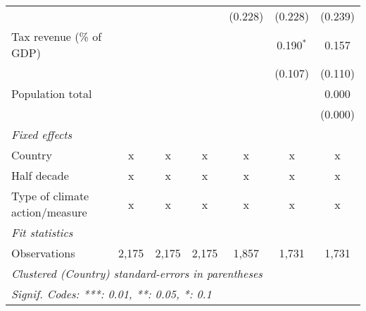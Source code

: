 \begin{tabular}{lcccccc}
                                                                 &             &         &         & (0.228)       & (0.228)      & (0.239)\\   
   Tax revenue (\% of GDP)                                       &             &         &         &               & 0.190$^{*}$  & 0.157\\   
                                                                 &             &         &         &               & (0.107)      & (0.110)\\   
   Population total                                              &             &         &         &               &              & 0.000\\   
                                                                 &             &         &         &               &              & (0.000)\\   
   \emph{Fixed effects}\\
   Country                                                       & x           & x       & x       & x             & x            & x\\  
   Half decade                                                   & x           & x       & x       & x             & x            & x\\  
   Type of climate action/measure                                & x           & x       & x       & x             & x            & x\\  
   \midrule \emph{Fit statistics}\\
   Observations                                                  & 2,175       & 2,175   & 2,175   & 1,857         & 1,731        & 1,731\\  
   \midrule
   \multicolumn{7}{l}{\emph{Clustered (Country) standard-errors in parentheses}}\\
   \multicolumn{7}{l}{\emph{Signif. Codes: ***: 0.01, **: 0.05, *: 0.1}}\\
\end{tabular}
\par\endgroup


